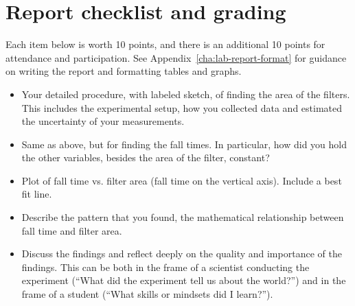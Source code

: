 %
%

\section{Report checklist and grading}

Each item below is worth 10 points, and there is an additional 10 points for attendance and participation. See Appendix\ \ref{cha:lab-report-format} for guidance on writing the report and formatting tables and graphs.

\begin{itemize}
	\item Your detailed procedure, with labeled sketch, of finding the area of the filters. This  includes the experimental setup, how you collected data and estimated the uncertainty of your measurements.
	
	\item Same as above, but for finding the fall times. In particular, how did you hold the other variables, besides the area of the filter, constant?
	
	\item Plot of fall time vs. filter area (fall time on the vertical axis). Include a best fit line.
	
	\item Describe the pattern that you found, the mathematical relationship between fall time and filter area.
	
	\item Discuss the findings and reflect deeply on the quality and importance of the findings. This can be both in the frame of a scientist conducting the experiment (``What did the experiment tell us about the world?'') and in the frame of a student (``What skills or mindsets did I learn?'').
\end{itemize}